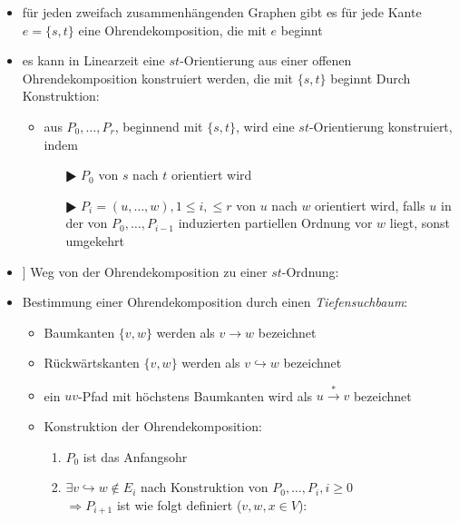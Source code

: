 \begin{itemize}[itemsep=-1pt]
	\item für jeden zweifach zusammenhängenden Graphen gibt es für jede Kante $e=\{s,t\}$ eine Ohrendekomposition, die mit $e$ beginnt
	\item es kann in Linearzeit eine $st$-Orientierung aus einer offenen Ohrendekomposition konstruiert werden, die mit $\{s,t\}$ beginnt
		\vspace*{-1.5\baselineskip}
		\Proof
		\vspace*{-\baselineskip}
		Durch Konstruktion:
			\begin{itemize}[itemsep=-1pt]
				\item aus $P_0,\dots,P_r$, beginnend mit $\{s,t\}$, wird eine $st$-Orientierung konstruiert, indem
					\begin{itemize}[itemsep=-1pt]
						\item[$\RHD$] $P_0$ von $s$ nach $t$ orientiert wird
						\item[$\RHD$] $P_i=(u,\dots,w),1\leq i,\leq r$ von $u$ nach $w$ orientiert wird, falls $u$ in der von $P_0,\dots,P_{i-1}$ induzierten partiellen Ordnung vor $w$ liegt, sonst umgekehrt
					\end{itemize}
			\end{itemize}
	\item] Weg von der Ohrendekomposition zu einer $st$-Ordnung: \begin{center}\end{center}
	\item Bestimmung einer Ohrendekomposition durch einen \textit{Tiefensuchbaum}:
		\begin{itemize}[itemsep=-1pt]
			\item Baumkanten $\{v,w\}$ werden als $v\rightarrow w$ bezeichnet
			\item Rückwärtskanten $\{v,w\}$ werden als $v\hookrightarrow w$ bezeichnet
			\item ein $uv$-Pfad mit höchstens Baumkanten wird als $u\overset{*}{\rightarrow}v$ bezeichnet
			\item Konstruktion der Ohrendekomposition:
				\begin{enumerate}[itemsep=-1pt]
					\item $P_0$ ist das Anfangsohr
					\item $\exists v\hookrightarrow w \notin E_i$ nach Konstruktion von $P_0,\dots,P_i,i\geq 0$\\
						$\Rightarrow P_{i+1}$ ist wie folgt definiert ($v,w,x \in V$):\\

\end{enumerate}
\end{itemize}
\end{itemize}

